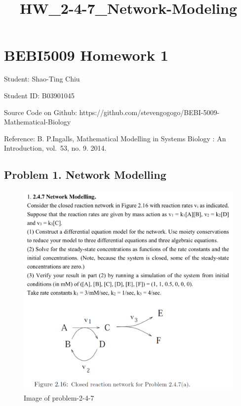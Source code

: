 \documentclass[11pt]{article}
\title{HW\_2-4-7\_Network-Modeling}
\makeatletter
\def\maxwidth{\ifdim\Gin@nat@width>\linewidth\linewidth
    \else\Gin@nat@width\fi}
\let\Oldincludegraphics\includegraphics
\renewcommand{\includegraphics}[1]{\Oldincludegraphics[width=.8\maxwidth]{#1}}
\makeatother
\begin{document}
    
    
    \maketitle
    
    

    
    \hypertarget{bebi5009-homework-1}{%
\section{BEBI5009 Homework 1}\label{bebi5009-homework-1}}

Student: Shao-Ting Chiu

Student ID: B03901045

Source Code on Github:
https://github.com/stevengogogo/BEBI-5009-Mathematical-Biology

Reference: B. P.Ingalls, Mathematical Modelling in Systems Biology : An
Introduction, vol.~53, no. 9. 2014.

    \hypertarget{problem-1.-network-modelling}{%
\subsection{Problem 1. Network
Modelling}\label{problem-1.-network-modelling}}

    \begin{figure}
\centering
\includegraphics{img/p2-4-7.png}
\caption{Image of problem-2-4-7}
\end{figure}
\end{document}
